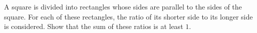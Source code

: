 A square is divided into rectangles whose sides are parallel to the sides of the square.
For each of these rectangles, the ratio of its shorter side to its longer side is considered.
Show that the sum of these ratios is at least $1$.